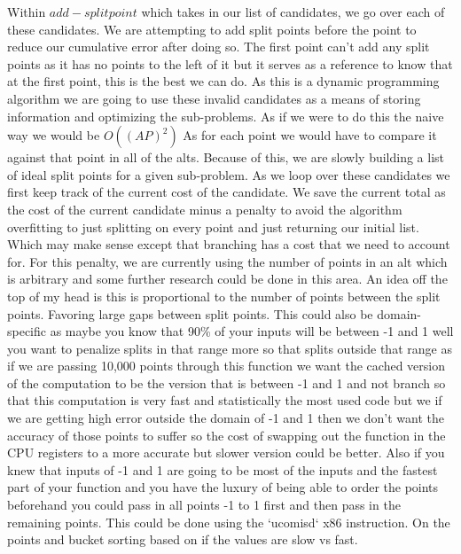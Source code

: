 \documentclass{article}
\begin{document}
Within $add-splitpoint$ which takes in our list of candidates, we go over each of these candidates. We are attempting to add split points before the point to reduce our cumulative error after doing so. The first point can’t add any split points as it has no points to the left of it but it serves as a reference to know that at the first point, this is the best we can do. As this is a dynamic programming algorithm we are going to use these invalid candidates as a means of storing information and optimizing the sub-problems. As if we were to do this the naive way we would be $O((AP)^2)$ As for each point we would have to compare it against that point in all of the alts. Because of this, we are slowly building a list of ideal split points for a given sub-problem. As we loop over these candidates we first keep track of the current cost of the candidate. We save the current total as the cost of the current candidate minus a penalty to avoid the algorithm overfitting to just splitting on every point and just returning our initial list. Which may make sense except that branching has a cost that we need to account for. For this penalty, we are currently using the number of points in an alt which is arbitrary and some further research could be done in this area. An idea off the top of my head is this is proportional to the number of points between the split points. Favoring large gaps between split points. This could also be domain-specific as maybe you know that 90\% of your inputs will be between -1 and 1 well you want to penalize splits in that range more so that splits outside that range as if we are passing 10,000 points through this function we want the cached version of the computation to be the version that is between -1 and 1 and not branch so that this computation is very fast and statistically the most used code but we if we are getting high error outside the domain of -1 and 1 then we don’t want the accuracy of those points to suffer so the cost of swapping out the function in the CPU registers to a more accurate but slower version could be better. Also if you knew that inputs of -1 and 1 are going to be most of the inputs and the fastest part of your function and you have the luxury of being able to order the points beforehand you could pass in all points -1 to 1 first and then pass in the remaining points. This could be done using the `ucomisd` x86 instruction. On the points and bucket sorting based on if the values are slow vs fast.
\end{document}
